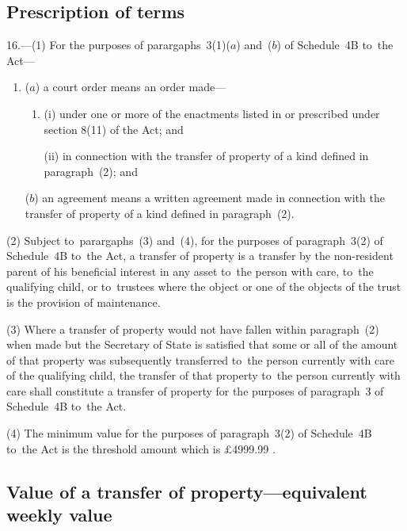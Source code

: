 \documentclass[12pt,a4paper]{article}
\begin{document}
\subsection[16. Prescription of terms]{Prescription of terms}

16.---(1)  For the purposes of parargaphs~3(1)($a$)  and~($b$)  of Schedule~4B to~the Act—
\begin{enumerate}\item[]
($a$) a court order means an order made—
\begin{enumerate}\item[]
(i) under one or more of the enactments listed in or prescribed under section 8(11) of the Act; and

(ii) in connection with the transfer of property of a kind defined in paragraph~(2); and
\end{enumerate}

($b$) an agreement means a written agreement made in connection with the transfer of property of a kind defined in paragraph~(2).
\end{enumerate}

(2) Subject to~parargaphs~(3) and~(4), for the purposes of paragraph~3(2) of Schedule~4B to~the Act, a transfer of property is a transfer by the non-resident parent of his beneficial interest in any asset to~the person with care, to~the qualifying child, or to~trustees where the object or one of the objects of the trust is the provision of maintenance.

(3) Where a transfer of property would not have fallen within paragraph~(2) when made but the Secretary of State is satisfied that some or all of the amount of that property was subsequently transferred to~the person currently with care of the qualifying child, the transfer of that property to~the person currently with care shall constitute a transfer of property for the purposes of paragraph~3 of Schedule~4B to~the Act.

(4) The minimum value for the purposes of paragraph~3(2) of Schedule~4B to~the Act is the threshold amount which is 
£4999$.$99%
.


\subsection[17. Value of a transfer of property—equivalent weekly value]{Value of a transfer of property—equivalent weekly value}
\end{document}
